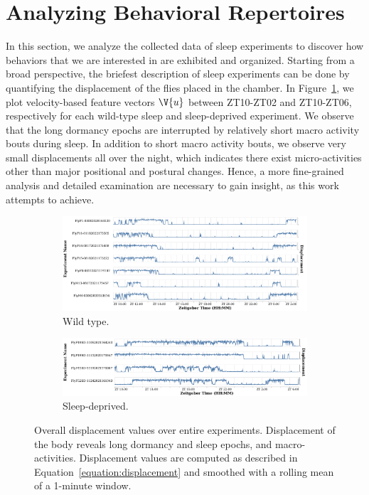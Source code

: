\section{Analyzing Behavioral Repertoires}\label{section:analyzing-behavioral-repertoires}
In this section, we analyze the collected data of sleep experiments to discover how behaviors that we are interested in are exhibited and organized.
Starting from a broad perspective, the briefest description of sleep experiments can be done by quantifying the displacement of the flies placed in the chamber.
In Figure~\ref{figure:displacement}, we plot velocity-based feature vectors $\V{u}$ between ZT10-ZT02 and ZT10-ZT06, respectively for each wild-type sleep and sleep-deprived experiment.
We observe that the long dormancy epochs are interrupted by relatively short macro activity bouts during sleep.
In addition to short macro activity bouts, we observe very small displacements all over the night, which indicates there exist micro-activities other than major positional and postural changes.
Hence, a more fine-grained analysis and detailed examination are necessary to gain insight, as this work attempts to achieve.

\begin{figure}[htb!]
	\centering
	\begin{subfigure}[b]{0.995\linewidth}
		\centering\includegraphics[width=\linewidth]{figures/Velocity-WT-1T.pdf}
		\caption{Wild type.}
	\end{subfigure}%

	\begin{subfigure}[b]{0.995\linewidth}
		\centering\includegraphics[width=\linewidth]{figures/Velocity-SD-1T.pdf}
		\caption{Sleep-deprived.}
	\end{subfigure}%
	\caption[Overall displacement values over entire experiments.]{Overall displacement values over entire experiments.
		Displacement of the body reveals long dormancy and sleep epochs, and macro-activities.
		Displacement values are computed as described in Equation~\ref{equation:displacement} and smoothed with a rolling mean of a 1-minute window.\label{figure:displacement}}
\end{figure}

